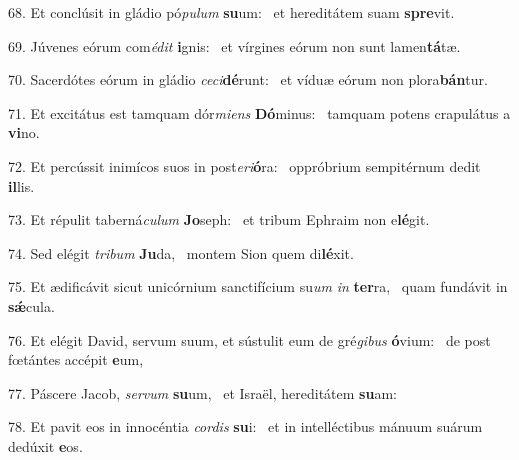 68. Et conclúsit in gládio pó\textit{pu}\textit{lum} \textbf{su}um: \ast\  et hereditátem suam \textbf{spre}vit.\

69. Júvenes eórum com\textit{é}\textit{dit} \textbf{i}gnis: \ast\  et vírgines eórum non sunt lamen\textbf{tá}tæ.\

70. Sacerdótes eórum in gládio \textit{ce}\textit{ci}\textbf{dé}runt: \ast\  et víduæ eórum non plora\textbf{bán}tur.\

71. Et excitátus est tamquam dór\textit{mi}\textit{ens} \textbf{Dó}minus: \ast\  tamquam potens crapulátus a \textbf{vi}no.\

72. Et percússit inimícos suos in post\textit{e}\textit{ri}\textbf{ó}ra: \ast\  oppróbrium sempitérnum dedit \textbf{il}lis.\

73. Et répulit taberná\textit{cu}\textit{lum} \textbf{Jo}seph: \ast\  et tribum Ephraim non e\textbf{lé}git.\

74. Sed elégit \textit{tri}\textit{bum} \textbf{Ju}da, \ast\  montem Sion quem di\textbf{lé}xit.\

75. Et ædificávit sicut unicórnium sanctifícium su\textit{um} \textit{in} \textbf{ter}ra, \ast\  quam fundávit in \textbf{sǽ}cula.\

76. Et elégit David, servum suum, et sústulit eum de gré\textit{gi}\textit{bus} \textbf{ó}vium: \ast\  de post fœtántes accépit \textbf{e}um,\

77. Páscere Jacob, \textit{ser}\textit{vum} \textbf{su}um, \ast\  et Israël, hereditátem \textbf{su}am:\

78. Et pavit eos in innocéntia \textit{cor}\textit{dis} \textbf{su}i: \ast\  et in intelléctibus mánuum suárum dedúxit \textbf{e}os.\

